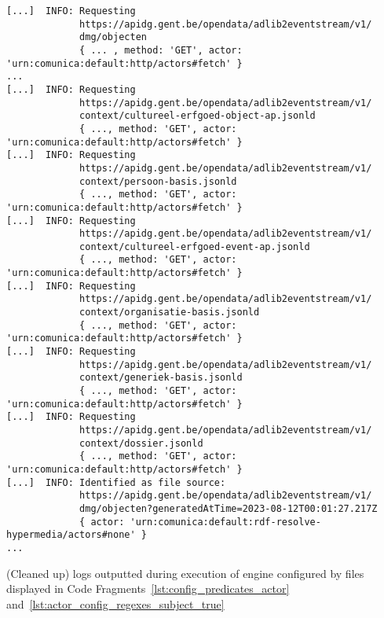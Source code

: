 \begin{listing}[htbp]
    \begin{verbatim}
[...]  INFO: Requesting
             https://apidg.gent.be/opendata/adlib2eventstream/v1/
             dmg/objecten
             { ... , method: 'GET', actor: 'urn:comunica:default:http/actors#fetch' }
...
[...]  INFO: Requesting
             https://apidg.gent.be/opendata/adlib2eventstream/v1/
             context/cultureel-erfgoed-object-ap.jsonld
             { ..., method: 'GET', actor: 'urn:comunica:default:http/actors#fetch' }
[...]  INFO: Requesting
             https://apidg.gent.be/opendata/adlib2eventstream/v1/
             context/persoon-basis.jsonld
             { ..., method: 'GET', actor: 'urn:comunica:default:http/actors#fetch' }
[...]  INFO: Requesting
             https://apidg.gent.be/opendata/adlib2eventstream/v1/
             context/cultureel-erfgoed-event-ap.jsonld
             { ..., method: 'GET', actor: 'urn:comunica:default:http/actors#fetch' }
[...]  INFO: Requesting
             https://apidg.gent.be/opendata/adlib2eventstream/v1/
             context/organisatie-basis.jsonld
             { ..., method: 'GET', actor: 'urn:comunica:default:http/actors#fetch' }
[...]  INFO: Requesting
             https://apidg.gent.be/opendata/adlib2eventstream/v1/
             context/generiek-basis.jsonld
             { ..., method: 'GET', actor: 'urn:comunica:default:http/actors#fetch' }
[...]  INFO: Requesting
             https://apidg.gent.be/opendata/adlib2eventstream/v1/
             context/dossier.jsonld
             { ..., method: 'GET', actor: 'urn:comunica:default:http/actors#fetch' }
[...]  INFO: Identified as file source:
             https://apidg.gent.be/opendata/adlib2eventstream/v1/
             dmg/objecten?generatedAtTime=2023-08-12T00:01:27.217Z
             { actor: 'urn:comunica:default:rdf-resolve-hypermedia/actors#none' }
...
    \end{verbatim}
    \caption{(Cleaned up) logs outputted during execution of engine configured by files displayed in Code Fragments~\ref{lst:config_predicates_actor} and~\ref{lst:actor_config_regexes_subject_true}}
    \label{lst:logs}
\end{listing}

